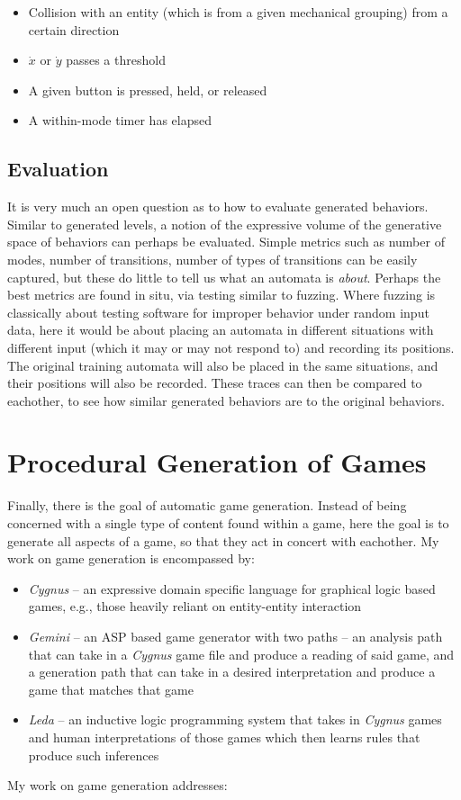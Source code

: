 \documentclass[12pt]{report}
\begin{document}
\begin{itemize}
\item Collision with an entity (which is from a given mechanical grouping) from a certain direction
\item  $\dot{x}$ or  $\dot{y}$ passes a threshold
\item A given button is pressed, held, or released
\item A within-mode timer has elapsed
\end{itemize}


\section*{Evaluation}

It is very much an open question as to how to evaluate generated behaviors.  Similar to generated levels, a notion of the expressive volume of the generative space of behaviors can perhaps be evaluated.  Simple metrics such as number of modes, number of transitions, number of types of transitions can be easily captured, but these do little to tell us what an automata is \textit{about}.  Perhaps the best metrics are found in situ, via testing similar to fuzzing.  Where fuzzing is classically about testing software for improper behavior under random input data, here it would be about placing an automata in different situations with different input (which it may or may not respond to) and recording its positions.  The original training automata will also be placed in the same situations, and their positions will also be recorded.  These traces can then be compared to eachother, to see how similar generated behaviors are to the original behaviors.

\chapter*{Procedural Generation of Games}

Finally, there is the goal of automatic game generation. Instead of being concerned with a single type of content found within a game, here the goal is to generate all aspects of a game, so that they act in concert with eachother.  My work on game generation is encompassed by:
\begin{itemize}
\item \textit{Cygnus} -- an expressive domain specific language for graphical logic based games, e.g., those heavily reliant on entity-entity interaction
\item \textit{Gemini} -- an ASP based game generator with two paths -- an analysis path that can take in a \textit{Cygnus} game file and produce a reading of said game, and a generation path that can take in a desired interpretation and produce a game that matches that game
\item \textit{Leda} -- an inductive logic programming system that takes in \textit{Cygnus} games and human interpretations of those games which then learns rules that produce such inferences

\end{itemize}
My work on game generation addresses:
\end{document}
